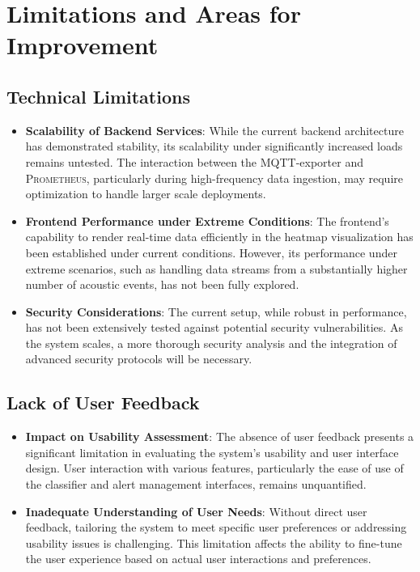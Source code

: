 \section{Limitations and Areas for Improvement}
\subsection{Technical Limitations}
\begin{itemize}
  \item \textbf{Scalability of Backend Services}: While the current backend architecture has demonstrated stability, its scalability under significantly increased loads remains untested. The interaction between the MQTT-exporter and \textsc{Prometheus}, particularly during high-frequency data ingestion, may require optimization to handle larger scale deployments.
  \item \textbf{Frontend Performance under Extreme Conditions}: The frontend's capability to render real-time data efficiently in the heatmap visualization has been established under current conditions. However, its performance under extreme scenarios, such as handling data streams from a substantially higher number of acoustic events, has not been fully explored.
  \item \textbf{Security Considerations}: The current setup, while robust in performance, has not been extensively tested against potential security vulnerabilities. As the system scales, a more thorough security analysis and the integration of advanced security protocols will be necessary.
\end{itemize}

\subsection{Lack of User Feedback}
\begin{itemize}
  \item \textbf{Impact on Usability Assessment}: The absence of user feedback presents a significant limitation in evaluating the system's usability and user interface design. User interaction with various features, particularly the ease of use of the classifier and alert management interfaces, remains unquantified.
  \item \textbf{Inadequate Understanding of User Needs}: Without direct user feedback, tailoring the system to meet specific user preferences or addressing usability issues is challenging. This limitation affects the ability to fine-tune the user experience based on actual user interactions and preferences.
\end{itemize}

